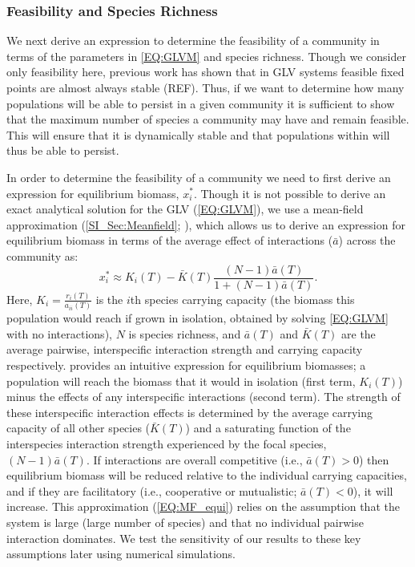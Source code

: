 \documentclass{article}
\begin{document}
\subsubsection*{Feasibility and Species Richness} \label{SEC:Feas_SP_rich}

We next derive an expression to determine the feasibility of a community in terms of the parameters in \cref{EQ:GLVM} and species richness. Though we consider only feasibility here, previous work has shown that in GLV systems feasible fixed points are almost always stable (REF). Thus, if we want to determine how many populations will be able to persist in a given community it is sufficient to show that the maximum number of species a community may have and remain feasible. This will ensure that it is dynamically stable and that populations within will thus be able to persist. 

In order to determine the feasibility of a community we need to first derive an expression for equilibrium biomass, $x^*_i$. Though it is not possible to derive an exact analytical solution for the GLV (\cref{EQ:GLVM}), we use a mean-field approximation (\cref{SI_Sec:Meanfield};  \citet{Wilson2003,Wilson2004}), which allows us to derive an expression for equilibrium biomass in terms of the average effect of interactions ($\bar{a}$) across the community as: 
\begin{equation}\label{EQ:MF_equi}
  x^*_i \approx K_i(T) -  \bar{K}(T)  \frac{ (N-1)\bar{a}(T)}{1 + (N-1)\bar{a}(T)}. 
\end{equation}
Here, $K_i = \frac{r_i(T)}{a_{ii}(T)}$ is the $i$th species carrying capacity (the biomass this population would reach if grown in isolation, obtained by solving \cref{EQ:GLVM} with no interactions), $N$ is species richness, and $\bar{a}(T)$ and $\bar{K}(T)$ are the average pairwise, interspecific interaction strength and carrying capacity respectively.  provides an intuitive expression for equilibrium biomasses; a population will reach the biomass that it would in isolation (first term, $K_i(T)$) minus the effects of any interspecific interactions (second term). The strength of these interspecific interaction effects is determined by the average carrying capacity of all other species ($\bar{K}(T)$) and a saturating function of the interspecies interaction strength experienced by the focal species, $(N-1)\bar{a}(T)$. If interactions are overall competitive (i.e., $\bar{a}(T) > 0$) then equilibrium biomass will be reduced relative to the individual carrying capacities, and if they are facilitatory (i.e., cooperative or mutualistic; $ \bar{a}(T) < 0$), it will increase. This approximation (\cref{EQ:MF_equi}) relies on the assumption that the system is large (large number of species) and that no individual pairwise interaction dominates. We test the sensitivity of our results to these key assumptions later using numerical simulations.
\end{document}
